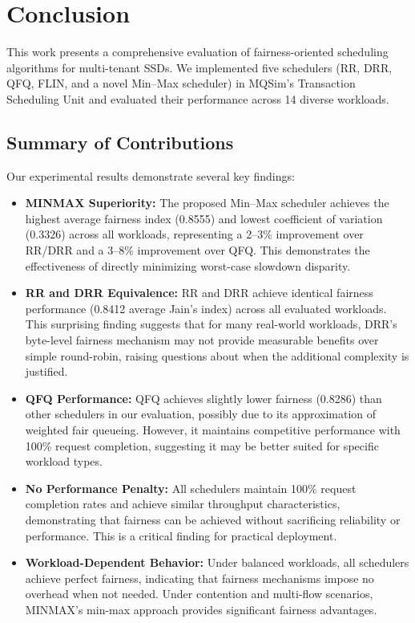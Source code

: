 \documentclass[11pt]{article}
\begin{document}
\section{Conclusion}

This work presents a comprehensive evaluation of fairness-oriented scheduling algorithms for multi-tenant SSDs. We implemented five schedulers (RR, DRR, QFQ, FLIN, and a novel Min--Max scheduler) in MQSim's Transaction Scheduling Unit and evaluated their performance across 14 diverse workloads.

\subsection{Summary of Contributions}

Our experimental results demonstrate several key findings:

\begin{itemize}
    \item \textbf{MINMAX Superiority:} The proposed Min--Max scheduler achieves the highest average fairness index (0.8555) and lowest coefficient of variation (0.3326) across all workloads, representing a 2--3\% improvement over RR/DRR and a 3--8\% improvement over QFQ. This demonstrates the effectiveness of directly minimizing worst-case slowdown disparity.
    
    \item \textbf{RR and DRR Equivalence:} RR and DRR achieve identical fairness performance (0.8412 average Jain's index) across all evaluated workloads. This surprising finding suggests that for many real-world workloads, DRR's byte-level fairness mechanism may not provide measurable benefits over simple round-robin, raising questions about when the additional complexity is justified.
    
    \item \textbf{QFQ Performance:} QFQ achieves slightly lower fairness (0.8286) than other schedulers in our evaluation, possibly due to its approximation of weighted fair queueing. However, it maintains competitive performance with 100\% request completion, suggesting it may be better suited for specific workload types.
    
    \item \textbf{No Performance Penalty:} All schedulers maintain 100\% request completion rates and achieve similar throughput characteristics, demonstrating that fairness can be achieved without sacrificing reliability or performance. This is a critical finding for practical deployment.
    
    \item \textbf{Workload-Dependent Behavior:} Under balanced workloads, all schedulers achieve perfect fairness, indicating that fairness mechanisms impose no overhead when not needed. Under contention and multi-flow scenarios, MINMAX's min-max approach provides significant fairness advantages.
\end{itemize}
\end{document}
